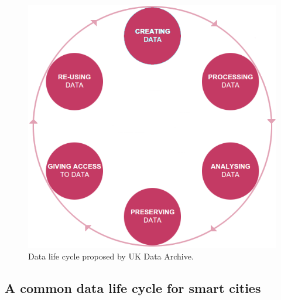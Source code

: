 \begin{figure}
    \center
    \includegraphics[scale=0.4]{img/data_lifecycle/uk-data-archive.png}
    \caption{Data life cycle proposed by UK Data Archive.}
    \label{fig:uk-data-archive}
\end{figure}

\subsection{A common data life cycle for smart cities}

